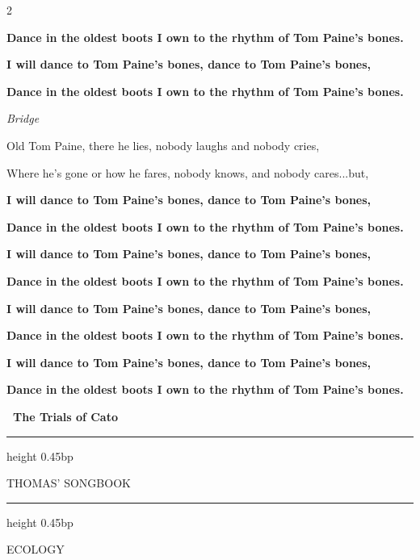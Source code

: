 \documentclass[10pt,twoside]{article}
\newlength{\songcolumnwidth}
\newcommand{\songbooktitle}{Thomas' Songbook}
\newcommand{\categorylabel}[1]{%
  {\categoryface\fontsize{17bp}{19bp}\selectfont\MakeUppercase{#1}}%
}
\newcommand{\category}[1]{%
  \par\noindent
  \parbox[c]{\songcolumnwidth}{%
    \centering
    \hrule height 0.45bp\vskip 2.5bp
    {\mastheadface\fontsize{10bp}{11bp}\selectfont\MakeUppercase{\songbooktitle}\par}%
    \vskip 2bp\hrule height 0.45bp
  }%
  \hfill
  \categorylabel{#1}%
  \par\vspace{11bp}%
}
\newcommand{\songtext}{\raggedright\fontsize{9bp}{9.15bp}\selectfont}
\newenvironment{songcolumns}
  {\begin{multicols*}{2}\songtext}
  {\end{multicols*}}
\newcommand{\lyric}[1]{%
  \hangindent=9bp\relax
  #1\par
}
\newenvironment{stanza}{\par\begingroup}{\par\endgroup\addvspace{4bp}}
\newcommand{\refrain}[1]{\lyric{\textbf{#1}}}
\newcommand{\playnote}[1]{%
  \par\addvspace{4bp}%
  {\sffamily\itshape\fontsize{7bp}{8bp}\selectfont #1\par}%
  \nobreak
}
\newcommand{\songcredit}[1]{%
  \par\nobreak\noindent\hspace*{9bp}%
  {\sffamily\bfseries\fontsize{7bp}{8bp}\selectfont\textemdash\ #1\par}%
}
\begin{document}
\begin{songcolumns}
\begin{stanza}
  \refrain{Dance in the oldest boots I own to the rhythm of Tom Paine's bones.}
  \refrain{I will dance to Tom Paine's bones, dance to Tom Paine's bones,}
  \refrain{Dance in the oldest boots I own to the rhythm of Tom Paine's bones.}
\end{stanza}
\playnote{Bridge}
\begin{stanza}
  \lyric{Old Tom Paine, there he lies, nobody laughs and nobody cries,}
  \lyric{Where he's gone or how he fares, nobody knows, and nobody cares...but,}
\end{stanza}
\begin{stanza}
  \refrain{I will dance to Tom Paine's bones, dance to Tom Paine's bones,}
  \refrain{Dance in the oldest boots I own to the rhythm of Tom Paine's bones.}
  \refrain{I will dance to Tom Paine's bones, dance to Tom Paine's bones,}
  \refrain{Dance in the oldest boots I own to the rhythm of Tom Paine's bones.}
\end{stanza}
\begin{stanza}
  \refrain{I will dance to Tom Paine's bones, dance to Tom Paine's bones,}
  \refrain{Dance in the oldest boots I own to the rhythm of Tom Paine's bones.}
  \refrain{I will dance to Tom Paine's bones, dance to Tom Paine's bones,}
  \refrain{Dance in the oldest boots I own to the rhythm of Tom Paine's bones.}
\end{stanza}
\songcredit{The Trials of Cato}

\end{songcolumns}

\clearpage

\category{Ecology}
\end{document}
